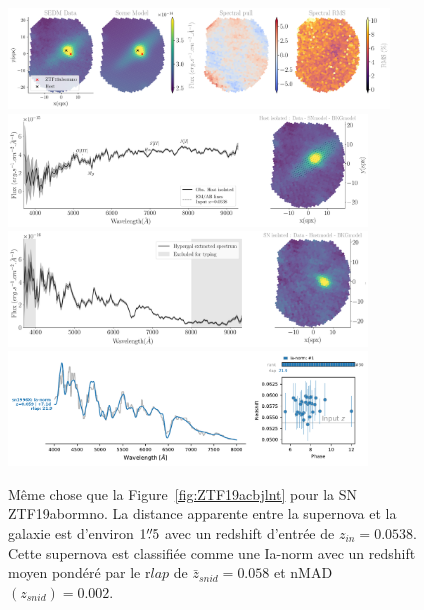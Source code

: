 \documentclass[../main/main.tex]{subfiles}
\begin{document}
\begin{figure}[ht]
  \centering
  \includegraphics[width=0.9\textwidth]{../figures/07_scene/scene_rmspull_ZTF19abormno.png}
  \includegraphics[width=0.85\textwidth]{../figures/07_scene/output_host_ZTF19abormno.png}
  \includegraphics[width=0.85\textwidth]{../figures/07_scene/output_target_ZTF19abormno.png}
  \includegraphics[width=0.85\textwidth]{../figures/07_scene/ZTF19abormno_snid_typing.pdf}
  \caption[Extraction de sources pour ZTF19abormno.]{Même chose que la
    Figure~\ref{fig:ZTF19acbjlnt} pour la SN ZTF19abormno. La distance apparente entre la
supernova et la galaxie est d'environ $1\overset{\prime\prime}{.}5$ avec un redshift
d'entrée de $z_{in}=0.0538$. Cette supernova est classifiée comme une Ia-norm
avec un redshift moyen pondéré par le r$lap$ de $\bar{z}_{snid}=0.058$ et
nMAD$(z_{snid})=0.002$.}
  \label{fig:ZTF19abormno}
\end{figure}

\end{document}
